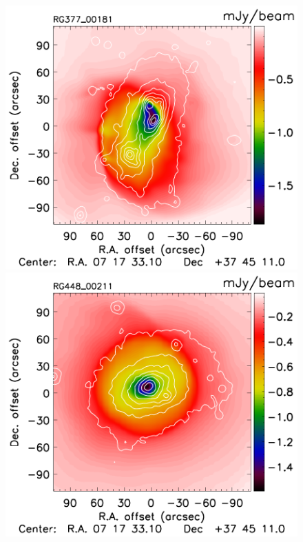 \documentclass[twocolumn,traditabstract]{aa}
\begin{document}
\begin{figure}[h]
\includegraphics[trim=0cm 0.7cm 0cm 0cm, clip=true, totalheight=3.6cm]{Figure/Map_RG377_00181_Ymap_zobs0p5_raw.pdf}
\includegraphics[trim=0cm 0.7cm 0cm 0cm, clip=true, totalheight=3.6cm]{Figure/Map_RG448_00211_Ymap_zobs0p4_raw.pdf}

\end{figure}
\end{document}
